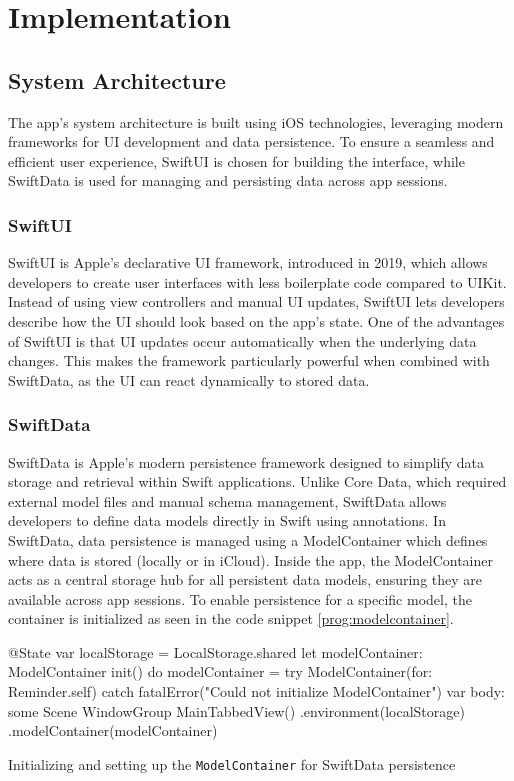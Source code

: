 \chapter{Implementation}
\label{cha:Implementation}

\section{System Architecture}
The app's system architecture is built using iOS technologies, leveraging modern frameworks for UI development and data persistence. 
To ensure a seamless and efficient user experience, SwiftUI is chosen for building the interface, while SwiftData is used for managing and persisting data across app sessions.

\subsection{SwiftUI}
SwiftUI is Apple's declarative UI framework, introduced in 2019, which allows developers to create user interfaces with less boilerplate code compared to UIKit. 
Instead of using view controllers and manual UI updates, SwiftUI lets developers describe how the UI should look based on the app's state.
One of the advantages of SwiftUI is that UI updates occur automatically when the underlying data changes. 
This makes the framework particularly powerful when combined with SwiftData, as the UI can react dynamically to stored data.

\subsection{SwiftData}
SwiftData is Apple's modern persistence framework designed to simplify data storage and retrieval within Swift applications. 
Unlike Core Data, which required external model files and manual schema management, SwiftData allows developers to define data models directly in Swift using annotations.
In SwiftData, data persistence is managed using a ModelContainer which defines where data is stored (locally or in iCloud). 
Inside the app, the ModelContainer acts as a central storage hub for all persistent data models, ensuring they are available across app sessions. 
To enable persistence for a specific model, the container is initialized as seen in the code snippet \ref{prog:modelcontainer}.

\begin{program}
    \begin{SwiftCode}
    @State var localStorage = LocalStorage.shared
    let modelContainer: ModelContainer
    init() {
        do {
            modelContainer = try ModelContainer(for: Reminder.self)
        } catch {
            fatalError("Could not initialize ModelContainer")
        }
    }
    var body: some Scene {
        WindowGroup {
            MainTabbedView()
        }
        .environment(localStorage)
        .modelContainer(modelContainer)
    }\end{SwiftCode}
    \caption{Initializing and setting up the \texttt{ModelContainer} for SwiftData persistence}
    \label{prog:modelcontainer}
\end{program}

